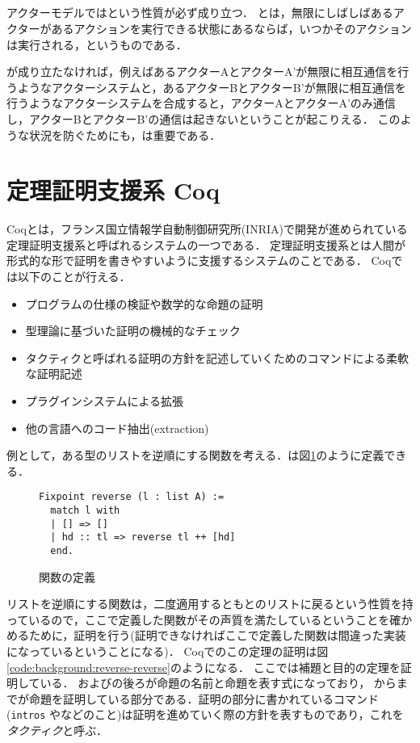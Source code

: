 \subsection{\fairness}

アクターモデルでは\fairness という性質が必ず成り立つ．
\fairness とは，無限にしばしばあるアクターがあるアクションを実行できる状態にあるならば，いつかそのアクションは実行される，というものである．

\fairness が成り立たなければ，例えばあるアクターAとアクターA'が無限に相互通信を行うようなアクターシステムと，あるアクターBとアクターB'が無限に相互通信を行うようなアクターシステムを合成すると，アクターAとアクターA'のみ通信し，アクターBとアクターB'の通信は起きないということが起こりえる．
このような状況を防ぐためにも，\fairness は重要である．


\section{定理証明支援系 Coq}

Coq\cite{Coq}とは，フランス国立情報学自動制御研究所(INRIA)で開発が進められている定理証明支援系と呼ばれるシステムの一つである．
定理証明支援系とは人間が形式的な形で証明を書きやすいように支援するシステムのことである．
Coqでは以下のことが行える．

\begin{itemize}
\item プログラムの仕様の検証や数学的な命題の証明
\item 型理論に基づいた証明の機械的なチェック
\item タクティクと呼ばれる証明の方針を記述していくためのコマンドによる柔軟な証明記述
\item プラグインシステムによる拡張
\item 他の言語へのコード抽出(extraction)
\end{itemize}

例として，ある型のリストを逆順にする関数を考える．は図\ref{code:background:reverse}のように定義できる．

\begin{figure}
\begin{lstlisting}
Fixpoint reverse (l : list A) :=
  match l with
  | [] => []
  | hd :: tl => reverse tl ++ [hd]
  end.
\end{lstlisting}
\caption{関数の定義}\label{code:background:reverse}
\end{figure}

リストを逆順にする関数は，二度適用するともとのリストに戻るという性質を持っているので，ここで定義した関数がその声質を満たしているということを確かめるために，証明を行う(証明できなければここで定義した関数は間違った実装になっているということになる)．
Coqでのこの定理の証明は図\ref{code:background:reverse-reverse}のようになる．
ここでは補題と目的の定理を証明している．
およびの後ろが命題の名前と命題を表す式になっており，
からまでが命題を証明している部分である．証明の部分に書かれているコマンド(\lstinline{intros} やなどのこと)は証明を進めていく際の方針を表すものであり，これを\emph{タクティク}と呼ぶ．

